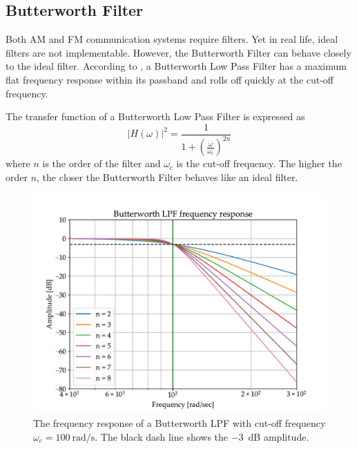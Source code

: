 \documentclass[../ECE459FinalProjectReport.tex]{subfiles}
\begin{document}
\subsection{Butterworth Filter}

Both AM and FM communication systems require filters. Yet in real life, ideal filters are not implementable. However, the Butterworth Filter can behave closely to the ideal filter. According to \cite{storrButterworthFilterDesign2013,kudekiAnalogSignalsSystems2009}, a Butterworth Low Pass Filter has a maximum flat frequency response within its passband and rolls off quickly at the cut-off frequency.

The transfer function of a Butterworth Low Pass Filter is expressed as
\begin{equation}
    \left| H\left( \omega \right) \right|^2=\frac{1}{1+\left( \frac{\omega}{\omega _c} \right) ^{2n}}
\end{equation}
where $n$ is the order of the filter and $\omega_c$ is the cut-off frequency. The higher the order $n$, the closer the Butterworth Filter behaves like an ideal filter.


\begin{figure}[b]
    \centering
    \includegraphics[scale=0.7]{plots/butterworth-lpf.pdf}
    \caption{The frequency response of a Butterworth LPF with cut-off frequency $\omega_c = \SI{100}{\radian\per\s}$. The black dash line shows the \SI{-3}{\dB} amplitude.}
    \label{fig:butter-lpf}
\end{figure}
\end{document}
